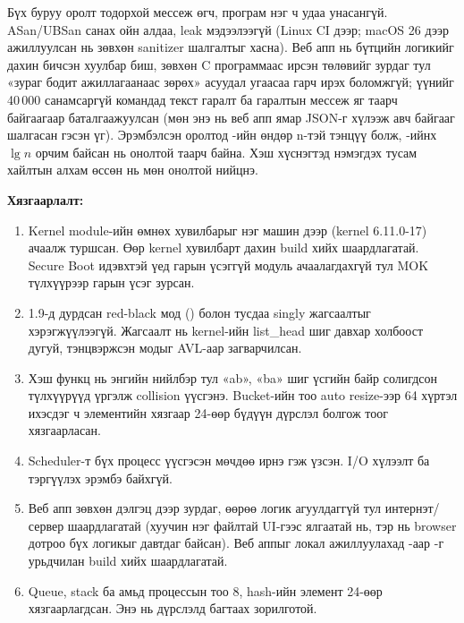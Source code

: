 Бүх буруу оролт тодорхой мессеж өгч, програм нэг ч удаа унасангүй. ASan/UBSan санах ойн алдаа, leak мэдээлээгүй (Linux CI дээр; macOS 26 дээр  ажиллуулсан нь зөвхөн sanitizer шалгалтыг хасна). Веб апп нь бүтцийн логикийг дахин бичсэн хуулбар биш, зөвхөн C программаас ирсэн  төлөвийг зурдаг тул «зураг бодит ажиллагаанаас зөрөх» асуудал угаасаа гарч ирэх боломжгүй; үүнийг 40\,000 санамсаргүй командад текст гаралт ба  гаралтын мессеж яг таарч байгаагаар баталгаажуулсан (мөн энэ нь веб апп ямар JSON-г хүлээж авч байгааг шалгасан гэсэн үг). Эрэмбэлсэн оролтод -ийн өндөр n-тэй тэнцүү болж, -ийнх $\lg n$ орчим байсан нь онолтой таарч байна. Хэш хүснэгтэд  нэмэгдэх тусам хайлтын алхам өссөн нь мөн онолтой нийцнэ.

\textbf{Хязгаарлалт:}

\begin{enumerate}[leftmargin=22pt,itemsep=2pt,topsep=2pt]
  \item Kernel module-ийн өмнөх хувилбарыг нэг машин дээр (kernel 6.11.0-17) ачаалж туршсан. Өөр kernel хувилбарт дахин build хийх шаардлагатай. Secure Boot идэвхтэй үед гарын үсэггүй модуль ачаалагдахгүй тул MOK түлхүүрээр гарын үсэг зурсан.
  \item 1.9-д дурдсан red-black мод () болон тусдаа singly жагсаалтыг хэрэгжүүлээгүй. Жагсаалт нь kernel-ийн list\_head шиг давхар холбоост дугуй, тэнцвэржсэн модыг AVL-аар загварчилсан.
  \item Хэш функц нь энгийн нийлбэр тул «ab», «ba» шиг үсгийн байр солигдсон түлхүүрүүд үргэлж collision үүсгэнэ. Bucket-ийн тоо auto resize-ээр 64 хүртэл ихэсдэг ч элементийн хязгаар 24-өөр бүдүүн дүрслэл болгож тоог хязгаарласан.
  \item Scheduler-т бүх процесс үүсгэсэн мөчдөө ирнэ гэж үзсэн. I/O хүлээлт ба тэргүүлэх эрэмбэ байхгүй.
  \item Веб апп зөвхөн дэлгэц дээр зурдаг, өөрөө логик агуулдаггүй тул интернэт/сервер шаардлагатай (хуучин нэг файлтай UI-гээс ялгаатай нь, тэр нь browser дотроо бүх логикыг давтдаг байсан). Веб аппыг локал ажиллуулахад -аар -г урьдчилан build хийх шаардлагатай.
  \item Queue, stack ба амьд процессын тоо 8, hash-ийн элемент 24-өөр хязгаарлагдсан. Энэ нь дүрслэлд багтаах зорилготой.
\end{enumerate}

